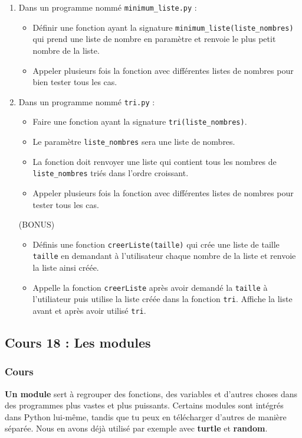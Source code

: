 \documentclass[11pt]{article}
\begin{document}
\begin{enumerate}
\item Dans un programme nommé \texttt{minimum\_liste.py} :
\begin{itemize}
\item Définir une fonction ayant la signature \texttt{minimum\_liste(liste\_nombres)} qui prend une liste de nombre en paramètre et renvoie le plus petit nombre de la liste.
\item Appeler plusieurs fois la fonction avec différentes listes de nombres pour bien tester tous les cas.
\end{itemize}

\item Dans un programme nommé \texttt{tri.py} :
\begin{itemize}
\item Faire une fonction ayant la signature \texttt{tri(liste\_nombres)}.
\item Le paramètre \texttt{liste\_nombres} sera une liste de nombres.
\item La fonction doit renvoyer une liste qui contient tous les nombres de \texttt{liste\_nombres} triés dans l'ordre croissant.
\item Appeler plusieurs fois la fonction avec différentes listes de nombres pour tester tous les cas.
\end{itemize}
(BONUS)
\begin{itemize}
\item Définis une fonction \texttt{creerListe(taille)} qui crée une liste de taille \texttt{taille} en demandant à l'utilisateur chaque nombre de la liste et renvoie la liste ainsi créée.
\item Appelle la fonction \texttt{creerListe} après avoir demandé la \texttt{taille} à l'utiliateur puis utilise la liste créée dans la fonction \texttt{tri}. Affiche la liste avant et après avoir utilisé \texttt{tri}.
\end{itemize}
\end{enumerate}

\subsection*{Cours 18 : Les modules}
\label{chapitre7_cours18}
\subsubsection*{Cours}
\label{sec:org85a8648}
\textbf{Un module} sert à regrouper des fonctions, des variables et d'autres choses dans des programmes plus vastes et plus puissants. Certains modules sont intégrés dans Python lui-même, tandis que tu peux en télécharger d'autres de manière séparée. Nous en avons déjà utilisé par exemple avec \textbf{turtle} et \textbf{random}.
\end{document}
